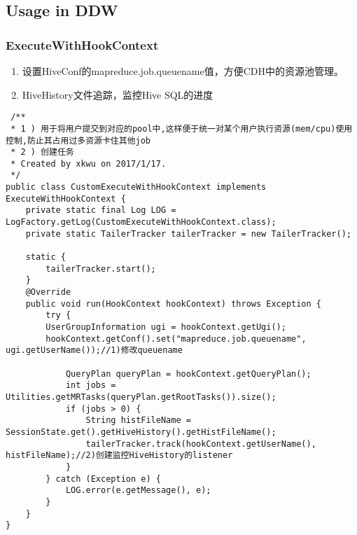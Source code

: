 \documentclass[11pt]{article}
\begin{document}
\subsection{Usage in DDW}
\label{sec:orga758aca}
\subsubsection{ExecuteWithHookContext}
\label{sec:org9a5dfb2}
\begin{enumerate}
\item 设置HiveConf的mapreduce.job.queuename值，方便CDH中的资源池管理。
\item HiveHistory文件追踪，监控Hive SQL的进度
\end{enumerate}
\begin{verbatim}
 /**
 * 1 ) 用于将用户提交到对应的pool中,这样便于统一对某个用户执行资源(mem/cpu)使用控制,防止其占用过多资源卡住其他job
 * 2 ) 创建任务
 * Created by xkwu on 2017/1/17.
 */
public class CustomExecuteWithHookContext implements ExecuteWithHookContext {
    private static final Log LOG = LogFactory.getLog(CustomExecuteWithHookContext.class);
    private static TailerTracker tailerTracker = new TailerTracker();

    static {
        tailerTracker.start();
    }
    @Override
    public void run(HookContext hookContext) throws Exception {
        try {
        UserGroupInformation ugi = hookContext.getUgi();
        hookContext.getConf().set("mapreduce.job.queuename", ugi.getUserName());//1)修改queuename

            QueryPlan queryPlan = hookContext.getQueryPlan();
            int jobs = Utilities.getMRTasks(queryPlan.getRootTasks()).size();
            if (jobs > 0) {
                String histFileName = SessionState.get().getHiveHistory().getHistFileName();
                tailerTracker.track(hookContext.getUserName(), histFileName);//2)创建监控HiveHistory的listener
            }
        } catch (Exception e) {
            LOG.error(e.getMessage(), e);
        }
    }
}
\end{verbatim}
\end{document}
